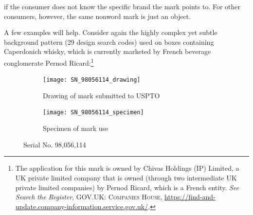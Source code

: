 \documentclass[letterpaper, 11pt, oneside]{article}
\begin{document}
if the consumer does not know the specific brand the mark points to. For other consumers, however, the same nonword mark is just an object. 

A few examples will help. Consider again the highly complex yet subtle background pattern (29 design search codes) used on boxes containing Caperdonich whisky, which is currently marketed by French beverage conglomerate Pernod Ricard:\footnote{The application for this mark is owned by Chivas Holdings (IP) Limited, a UK private limited company that is owned (through two intermediate UK private limited companies) by Pernod Ricard, which is a French entity. \textit{See Search the Register}, \textsc{GOV.UK: Companies House}, \url{https://find-and-update.company-information.service.gov.uk/}.}

\begin{figure}[H]
\centering
\begin{subfigure}[h]{0.2\linewidth}
\texttt{[image: SN\_98056114\_drawing]} \
\caption{Drawing of mark submitted to USPTO}
\end{subfigure}
\hspace{30pt}
\begin{subfigure}[h]{0.225\linewidth}
\texttt{[image: SN\_98056114\_specimen]} \
\caption{Specimen of mark use}
\end{subfigure}
\caption*{Serial No. 98,056,114}
\end{figure}
\par
\end{document}
